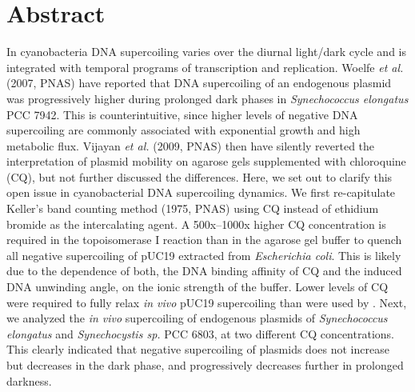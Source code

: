 \documentclass[10pt,a4]{article}
\begin{document}
\section*{Abstract}
In cyanobacteria DNA supercoiling varies over the diurnal light/dark
cycle and is integrated with temporal programs of transcription and
replication. Woelfe \textit{et al.} (2007, PNAS) have reported that
DNA supercoiling of an endogenous plasmid was progressively higher
during prolonged dark phases in \textit{Synechococcus elongatus} PCC
7942.  This is counterintuitive, since higher levels of negative DNA
supercoiling are commonly associated with exponential growth and high
metabolic flux. Vijayan \textit{et al.} (2009, PNAS) then have
silently reverted the interpretation of plasmid mobility on agarose
gels supplemented with chloroquine (CQ), but not further discussed the
differences.
%
Here, we set out to clarify this open issue in cyanobacterial DNA
supercoiling dynamics. We first re-capitulate Keller's band counting
method (1975, PNAS) using CQ instead of ethidium bromide as the
intercalating agent.  A 500x--1000x higher CQ concentration is
required in the topoisomerase I reaction than in the agarose gel
buffer to quench all negative supercoiling of pUC19 extracted from
\textit{Escherichia coli}. This is likely due to the dependence of
both, the DNA binding affinity of CQ and the induced DNA unwinding
angle, on the ionic strength of the buffer. Lower levels of CQ were
required to fully relax \textit{in vivo} pUC19 supercoiling than were
used by \citet{Woelfle2007}. Next, we analyzed the \textit{in vivo}
supercoiling of endogenous plasmids of \textit{Synechococcus
  elongatus} and \textit{Synechocystis sp.} PCC 6803, at two different
CQ concentrations.  This clearly indicated that negative supercoiling
of plasmids does not increase but decreases in the dark phase, and
progressively decreases further in prolonged darkness.

\linenumbers
\end{document}
